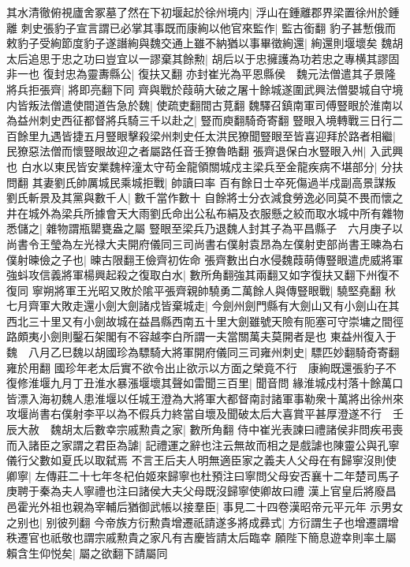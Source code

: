 其水清徹俯視廬舍冢墓了然在下初堰起於徐州境内|{
	浮山在鍾離郡界梁置徐州於鍾離}
刺史張豹子宣言謂已必掌其事既而康絢以他官來監作|{
	監古銜翻}
豹子甚慙俄而敕豹子受絢節度豹子遂譖絢與魏交通上雖不納猶以事畢徵絢還|{
	絢還則堰壞矣}
魏胡太后追思于忠之功曰豈宜以一謬棄其餘勲|{
	胡后以于忠擁護為功若忠之專横其謬固非一也}
復封忠為靈夀縣公|{
	復扶又翻}
亦封崔光為平恩縣侯　魏元法僧遣其子景隆將兵拒張齊|{
	將即亮翻下同}
齊與戰於葭萌大破之屠十餘城遂圍武興法僧嬰城自守境内皆叛法僧遣使間道告急於魏|{
	使疏吏翻間古莧翻}
魏驛召鎮南軍司傅豎眼於淮南以為益州刺史西征都督將兵騎三千以赴之|{
	豎而庾翻騎奇寄翻}
豎眼入境轉戰三日行二百餘里九遇皆捷五月豎眼擊殺梁州刺史任太洪民獠聞豎眼至皆喜迎拜於路者相繼|{
	民獠惡法僧而懷豎眼故迎之者屬路任音壬獠魯皓翻}
張齊退保白水豎眼入州|{
	入武興也}
白水以東民皆安業魏梓潼太守苟金龍領關城戍主梁兵至金龍疾病不堪部分|{
	分扶問翻}
其妻劉氏帥厲城民乘城拒戰|{
	帥讀曰率}
百有餘日士卒死傷過半戍副高景謀叛劉氏斬景及其黨與數千人|{
	數千當作數十}
自餘將士分衣減食勞逸必同莫不畏而懷之井在城外為梁兵所據會天大雨劉氏命出公私布絹及衣服懸之絞而取水城中所有雜物悉儲之|{
	雜物謂瓶罌甕盎之屬}
豎眼至梁兵乃退魏人封其子為平昌縣子　六月庚子以尚書令王瑩為左光禄大夫開府儀同三司尚書右僕射袁昂為左僕射吏部尚書王暕為右僕射暕儉之子也|{
	暕古限翻王儉齊初佐命}
張齊數出白水侵魏葭萌傳豎眼遣虎威將軍強蚪攻信義將軍楊興起殺之復取白水|{
	數所角翻強其兩翻又如字復扶又翻下州復不復同}
寧朔將軍王光昭又敗於隂平張齊親帥驍勇二萬餘人與傳豎眼戰|{
	驍堅堯翻}
秋七月齊軍大敗走還小劍大劍諸戍皆棄城走|{
	今劍州劍門縣有大劍山又有小劍山在其西北三十里又有小劍故城在益昌縣西南五十里大劍雖號天險有阨塞可守崇墉之間徑路頗夷小劍則鑿石架閣有不容越李白所謂一夫當關萬夫莫開者是也}
東益州復入于魏　八月乙巳魏以胡國珍為驃騎大將軍開府儀同三司雍州刺史|{
	驃匹妙翻騎奇寄翻雍於用翻}
國珍年老太后實不欲令出止欲示以方面之榮竟不行　康絢既還張豹子不復修淮堰九月丁丑淮水暴漲堰壞其聲如雷聞三百里|{
	聞音問}
緣淮城戍村落十餘萬口皆漂入海初魏人患淮堰以任城王澄為大將軍大都督南討諸軍事勒衆十萬將出徐州來攻堰尚書右僕射李平以為不假兵力終當自壞及聞破太后大喜賞平甚厚澄遂不行　壬辰大赦　魏胡太后數幸宗戚勲貴之家|{
	數所角翻}
侍中崔光表諫曰禮諸侯非問疾弔喪而入諸臣之家謂之君臣為謔|{
	記禮運之辭也注云無故而相之是戲謔也陳靈公與孔寧儀行父數如夏氏以取弑焉}
不言王后夫人明無適臣家之義夫人父母在有歸寧沒則使卿寧|{
	左傳莊二十七年冬杞伯姬來歸寧也杜預注曰寧問父母安否襄十二年楚司馬子庚聘于秦為夫人寧禮也注曰諸侯大夫父母既沒歸寧使卿故曰禮}
漢上官皇后將廢昌邑霍光外祖也親為宰輔后猶御武帳以接羣臣|{
	事見二十四卷漢昭帝元平元年}
示男女之别也|{
	别彼列翻}
今帝族方衍勲貴增遷祇請遂多將成彞式|{
	方衍謂生子也增遷謂增秩遷官也祇敬也謂宗戚勲貴之家凡有吉慶皆請太后臨幸}
願陛下簡息遊幸則率土屬賴含生仰悦矣|{
	屬之欲翻下請屬同}
